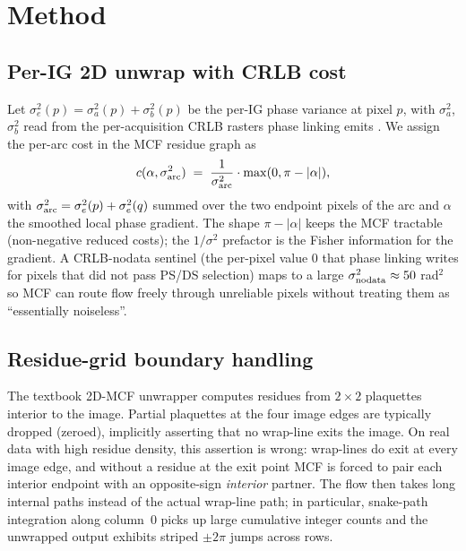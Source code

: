 \documentclass[journal]{IEEEtran}
\begin{document}
\section{Method}\label{sec:method}

\subsection{Per-IG 2D unwrap with CRLB cost}\label{sec:crlb-cost}

Let $\sigma^2_e(p)=\sigma^2_a(p)+\sigma^2_b(p)$ be the per-IG phase
variance at pixel $p$, with $\sigma^2_a$, $\sigma^2_b$ read from the
per-acquisition CRLB rasters phase linking emits \cite{phaselink-emi}.
We assign the per-arc cost in the MCF residue graph as
\begin{equation}
c(\alpha,\sigma^2_{\rm arc}) \;=\; \frac{1}{\sigma^2_{\rm arc}}\cdot
\max(0,\pi-|\alpha|),
\label{eq:crlbcost}
\end{equation}
with $\sigma^2_{\rm arc}=\sigma^2_e(p)+\sigma^2_e(q)$ summed over the
two endpoint pixels of the arc and $\alpha$ the smoothed local phase
gradient. The shape $\pi-|\alpha|$ keeps the MCF tractable
(non-negative reduced costs); the $1/\sigma^2$ prefactor is the Fisher
information for the gradient. A CRLB-nodata sentinel (the per-pixel
value $0$ that phase linking writes for pixels that did not pass
PS/DS selection) maps to a large $\sigma^2_{\rm nodata}\approx 50$
rad${}^2$ so MCF can route flow freely through unreliable pixels
without treating them as ``essentially noiseless''.

\subsection{Residue-grid boundary handling}\label{sec:bdy}

The textbook 2D-MCF unwrapper computes residues from $2\times 2$
plaquettes interior to the image. Partial plaquettes at the four image
edges are typically dropped (zeroed), implicitly asserting that no
wrap-line exits the image. On real data with high residue density,
this assertion is wrong: wrap-lines do exit at every image edge, and
without a residue at the exit point MCF is forced to pair each interior
endpoint with an opposite-sign \emph{interior} partner. The flow then
takes long internal paths instead of the actual wrap-line path; in
particular, snake-path integration along column~0 picks up large
cumulative integer counts and the unwrapped output exhibits striped
$\pm 2\pi$ jumps across rows.
\end{document}
